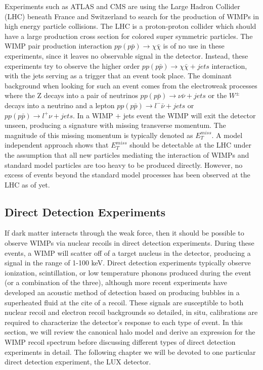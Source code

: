 \documentclass[a4paper,12pt]{article}
\begin{document}
Experiments such as ATLAS and CMS are using the Large Hadron Collider (LHC) beneath France and Switzerland to search for the production of WIMPs in high energy particle collisions.  The LHC is a proton-proton collider which should have a large production cross section for colored super symmetric particles.  The WIMP pair production interaction $pp (p\bar{p}) \rightarrow \chi \bar{\chi}$ is of no use in these experiments, since it leaves no observable signal in the detector.  Instead, these experiments try to observe the higher order $pp (p\bar{p}) \rightarrow \chi \bar{\chi} + jets$ interaction, with the jets serving as a trigger that an event took place.  The dominant background when looking for such an event comes from the electroweak processes where the Z decays into a pair of neutrinos $pp (p\bar{p}) \rightarrow \nu \bar{\nu} + jets$ or the $W^{\pm}$ decays into a neutrino and a lepton $pp (p\bar{p}) \rightarrow l^{-}\bar{\nu} + jets$ or $pp (p\bar{p}) \rightarrow l^{+}\nu + jets$. In a WIMP $+$ jets event the WIMP will exit the detector unseen, producing a signature with missing transverse momentum.  The magnitude of this missing momentum is typically denoted as $E_T^{miss}$.  A model independent approach shows that $E_T^{miss}$ should be detectable at the LHC under the assumption that all new particles mediating the interaction of WIMPs and standard model particles are too heavy to be produced directly.  \cite{Beltran} However, no excess of events beyond the standard model processes has been observed at the LHC as of yet.  \cite{ATLAS}


\subsection{Direct Detection Experiments}
If dark matter interacts through the weak force, then it should be possible to observe WIMPs via nuclear recoils in direct detection experiments. During these events, a WIMP will scatter off of a target nucleus in the detector, producing a signal in the range of 1-100 keV. \cite{Lewin}   Direct detection experiments typically observe ionization, scintillation, or low temperature phonons produced during the event (or a combination of the three), although more recent experiments have developed an acoustic method of detection based on producing bubbles in a superheated fluid at the cite of a recoil.  These signals are susceptible to both nuclear recoil and electron recoil backgrounds so detailed, in situ, calibrations are required to characterize the detector's response to each type of event.  In this section, we will review the canonical halo model and derive an expression for the WIMP recoil spectrum before discussing different types of direct detection experiments in detail.  The following chapter we will be devoted to one particular direct detection experiment, the LUX detector.
\end{document}
